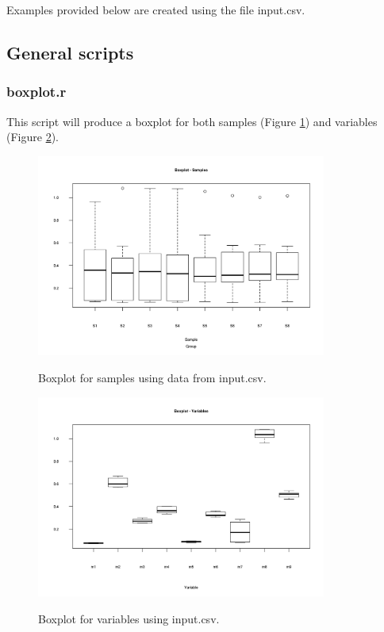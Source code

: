 \documentclass[english,a4paper,12pt]{article}
\begin{document}
Examples provided below are created using the file \textsf{input.csv}.

\subsection*{General scripts}

\subsubsection*{boxplot.r}
This script will produce a boxplot for both samples (Figure \ref{fig:boxplot_smpl}) and variables (Figure \ref{fig:boxplot_var}).

\begin{figure}[p]
\centering
\includegraphics[width=0.85\textwidth]{images/boxplot_smpl.png} \\
\caption[Boxplot - Samples]{Boxplot for samples using data from \textsf{input.csv}.}
\label{fig:boxplot_smpl}
\end{figure}

\begin{figure}[p]
\centering
\includegraphics[width=0.85\textwidth]{images/boxplot_var.png} \\
\caption[Boxplot - Variables]{Boxplot for variables using input.csv.}
\label{fig:boxplot_var}
\end{figure}
\end{document}
